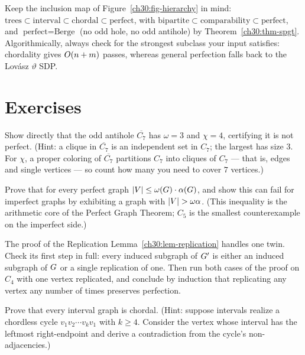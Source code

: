 \begin{marginnotebox}
Keep the inclusion map of Figure~\ref{ch30:fig-hierarchy} in mind: $\text{trees} \subset \text{interval} \subset \text{chordal} \subset \text{perfect}$, with $\text{bipartite} \subset \text{comparability} \subset \text{perfect}$, and $\text{perfect} = \text{Berge}$ (no odd hole, no odd antihole) by Theorem~\ref{ch30:thm-spgt}. Algorithmically, always check for the strongest subclass your input satisfies: chordality gives $O(n+m)$ passes, whereas general perfection falls back to the Lov\'asz $\vartheta$ SDP.
\end{marginnotebox}

\section*{Exercises}

\begin{exercise}
Show directly that the odd antihole $\overline{C_7}$ has $\omega=3$ and $\chi=4$, certifying it is not perfect. (Hint: a clique in $\overline{C_7}$ is an independent set in $C_7$; the largest has size $3$. For $\chi$, a proper coloring of $\overline{C_7}$ partitions $C_7$ into cliques of $C_7$ --- that is, edges and single vertices --- so count how many you need to cover $7$ vertices.)
\end{exercise}

\begin{exercise}
Prove that for every perfect graph $\lvert V\rvert\le\omega(G)\cdot\alpha(G)$, and show this can fail for imperfect graphs by exhibiting a graph with $\lvert V\rvert>\omega\alpha$. (This inequality is the arithmetic core of the Perfect Graph Theorem; $C_5$ is the smallest counterexample on the imperfect side.)
\end{exercise}

\begin{exercise}
The proof of the Replication Lemma~\ref{ch30:lem-replication} handles one twin. Check its first step in full: every induced subgraph of $G'$ is either an induced subgraph of $G$ or a single replication of one. Then run both cases of the proof on $C_4$ with one vertex replicated, and conclude by induction that replicating any vertex any number of times preserves perfection.
\end{exercise}

\begin{exercise}\label{ch30:ex-interval-chordal}
Prove that every interval graph is chordal. (Hint: suppose intervals realize a chordless cycle $v_1v_2\cdots v_k v_1$ with $k\ge4$. Consider the vertex whose interval has the leftmost right-endpoint and derive a contradiction from the cycle's non-adjacencies.)
\end{exercise}

